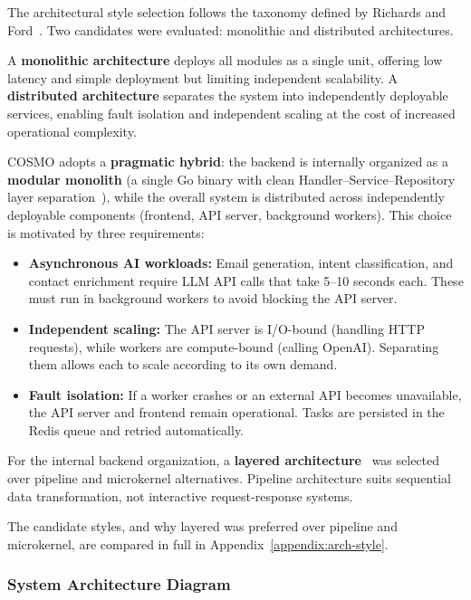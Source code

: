 \documentclass[a4paper]{article}
\begin{document}
The architectural style selection follows the taxonomy defined by 
Richards and Ford~\cite{richards2020fundamentals}. Two candidates 
were evaluated: monolithic and distributed architectures.

A \textbf{monolithic architecture} deploys all modules as a single 
unit, offering low latency and simple deployment but limiting 
independent scalability. A \textbf{distributed architecture} 
separates the system into independently deployable services, 
enabling fault isolation and independent scaling at the cost of 
increased operational complexity.

COSMO adopts a \textbf{pragmatic hybrid}: the backend is internally 
organized as a \textbf{modular monolith} (a single Go binary with 
clean Handler--Service--Repository layer 
separation~\cite{richards2020fundamentals}), while the overall 
system is distributed across independently deployable components 
(frontend, API server, background workers). This choice is 
motivated by three requirements:

\begin{itemize}
  \item \textbf{Asynchronous AI workloads:} Email generation, 
  intent classification, and contact enrichment require LLM API 
  calls that take 5--10 seconds each. These must run in background 
  workers to avoid blocking the API server.

  \item \textbf{Independent scaling:} The API server is I/O-bound 
  (handling HTTP requests), while workers are compute-bound 
  (calling OpenAI). Separating them allows each to scale according 
  to its own demand.

  \item \textbf{Fault isolation:} If a worker crashes or an 
  external API becomes unavailable, the API server and frontend 
  remain operational. Tasks are persisted in the Redis queue and 
  retried automatically.
\end{itemize}

For the internal backend organization, a \textbf{layered 
architecture}~\cite{richards2020fundamentals} was selected over 
pipeline and microkernel alternatives. Pipeline architecture suits 
sequential data transformation, not interactive request-response 
systems. 

The candidate styles, and why layered was preferred over pipeline and
microkernel, are compared in full in Appendix~\ref{appendix:arch-style}.

\subsubsection{System Architecture Diagram}
\end{document}
